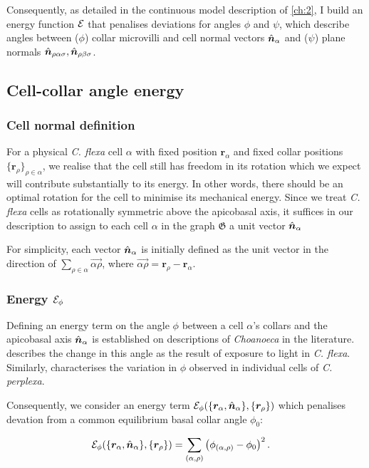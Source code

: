 Consequently, as detailed in the continuous model description of \cref{ch:2}, I build an energy function $\mathcal{E}$ that penalises deviations for angles $\phi$ and $\psi$, which describe angles between ($\phi$) collar microvilli and cell normal vectors $\hat{\bm{n}}_\alpha$ and ($\psi$) plane normals $\hat{\bm{n}}_{\rho\alpha\sigma}, \hat{\bm{n}}_{\rho\beta\sigma}$.

\subsection{Cell-collar angle energy}
\subsubsection{Cell normal definition}
For a physical \textit{C. flexa} cell $\alpha$ with fixed position $\bm{r}_\alpha$ and fixed collar positions $\{\bm{r}_\rho\}_{\rho\in\alpha}$, we realise that the cell still has freedom in its rotation which we expect will contribute substantially to its energy. 
In other words, there should be an optimal rotation for the cell to minimise its mechanical energy. 
Since we treat \textit{C. flexa} cells as rotationally symmetric above the apicobasal axis, it suffices in our description to assign to each cell $\alpha$ in the graph $\mathfrak{G}$ a unit vector $\hat{\bm{n}}_\alpha$ 

For simplicity, each vector $\hat{\bm{n}}_\alpha$ is initially defined as the unit vector in the direction of $\sum_{\rho\in\alpha} \vec{\alpha\rho}$, where $\vec{\alpha\rho} = \bm{r}_\rho - \bm{r}_\alpha$.

\subsubsection{Energy $\mathcal{E}_\phi$}

Defining an energy term on the angle $\phi$ between a cell $\alpha$'s collars and the apicobasal axis $\hat{\bm{n}}_\alpha$ is established on descriptions of \textit{Choanoeca} in the literature. 
\citet{brunet2019} describes the change in this angle as the result of exposure to light in \textit{C. flexa}.
Similarly, \citet{ellis1930} characterises the variation in $\phi$ observed in individual cells of \textit{C. perplexa}.

Consequently, we consider an energy term $\mathcal{E}_\phi(\{\bm{r}_\alpha, \hat{\bm{n}}_\alpha\}, \{\bm{r}_\rho\})$ which penalises devation from a common equilibrium basal collar angle $\phi_0$:

\begin{align}
	\mathcal{E}_\phi(\{\bm{r}_\alpha, \hat{\bm{n}}_\alpha\}, \{\bm{r}_\rho\}) &= \sum_{(\alpha, \rho)} \left(\phi_{(\alpha, \rho)} - \phi_0 \right)^2. \label{eq:e_phi}
\end{align}

